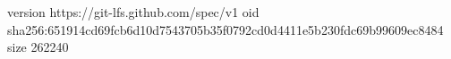 version https://git-lfs.github.com/spec/v1
oid sha256:651914cd69fcb6d10d7543705b35f0792cd0d4411e5b230fdc69b99609ec8484
size 262240
